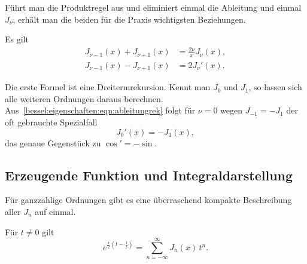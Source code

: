 Führt man die Produktregel aus und eliminiert einmal die Ableitung und einmal $J_\nu$, erhält man die beiden für die Praxis wichtigsten Beziehungen.
 
\begin{korollar}
\label{bessel:eigenschaften:korollar:rekursion}
Es gilt
\begin{align}
J_{\nu-1}(x) + J_{\nu+1}(x)
&=
\frac{2\nu}{x} J_\nu(x),
\label{bessel:eigenschaften:eqn:dreiterm}
\\
J_{\nu-1}(x) - J_{\nu+1}(x)
&=
2 J_\nu'(x).
\label{bessel:eigenschaften:eqn:ableitungrek}
\end{align}
\end{korollar}
 
Die erste Formel ist eine Dreitermrekursion.
Kennt man $J_0$ und $J_1$, so lassen sich alle weiteren Ordnungen daraus berechnen.
Aus~\eqref{bessel:eigenschaften:eqn:ableitungrek} folgt für $\nu=0$ wegen $J_{-1}=-J_1$ der oft gebrauchte Spezialfall
\begin{equation}
J_0'(x) = -J_1(x),
\label{bessel:eigenschaften:eqn:j0strich}
\end{equation}
das genaue Gegenstück zu $\cos' = -\sin$.
 
%
%
\subsection{Erzeugende Funktion und Integraldarstellung
\label{bessel:eigenschaften:subsection:erzeugend}}
Für ganzzahlige Ordnungen gibt es eine überraschend kompakte Beschreibung aller $J_n$ auf einmal.
 
\begin{satz}
\label{bessel:eigenschaften:satz:erzeugend}
Für $t\ne 0$ gilt
\begin{equation}
e^{\frac{x}{2}\left(t-\frac{1}{t}\right)}
=
\sum_{n=-\infty}^{\infty}
J_n(x)\, t^n.
\label{bessel:eigenschaften:eqn:erzeugend}
\end{equation}
\end{satz}
 
